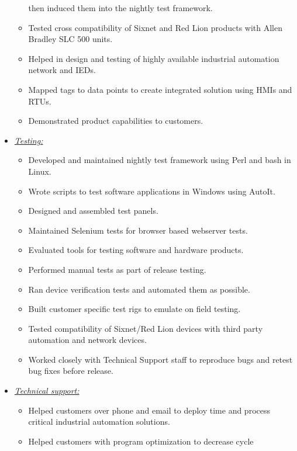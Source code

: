 \documentclass{article}
\begin{document}
\begin{itemize}
\begin{itemize}
                then induced them into the nightly test framework.
          \item Tested cross compatibility of Sixnet and Red Lion products with
                Allen Bradley SLC 500 units.
          \item Helped in design and testing of highly available industrial
                automation network and IEDs.
          \item Mapped tags to data points to create integrated solution using
                HMIs and RTUs.
          \item Demonstrated product capabilities to customers.
          \end{itemize}
    \item \underline{\it Testing:}
          \begin{itemize}
          \item Developed and maintained nightly test framework using Perl
                and bash in Linux.
          \item Wrote scripts to test software applications in Windows using
                AutoIt.
          \item Designed and assembled test panels.
          \item Maintained Selenium tests for browser based webserver tests.
          \item Evaluated tools for testing software and hardware products.
          \item Performed manual tests as part of release testing.
          \item Ran device verification tests and automated them as possible.
          \item Built customer specific test rigs to emulate on field testing.
          \item Tested compatibility of Sixnet/Red Lion devices with third
                party automation and network devices.
          \item Worked closely with Technical Support staff to reproduce bugs
                and retest bug fixes before release.
          \end{itemize}
    \item \underline{\it Technical support:}
          \begin{itemize}
          \item Helped customers over phone and email to deploy time and process
                critical industrial automation solutions.
          \item Helped customers with program optimization to decrease cycle

\end{itemize}
\end{itemize}
\end{document}
